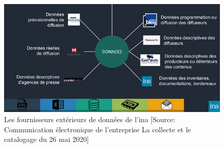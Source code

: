 \begin{figure}[!h]
	\centering
	\includegraphics[width=16cm]{images/enrichissement_dl.jpg}
	\caption[Les fournisseurs extérieurs de données de l'\ac{ina}]{Les fournisseurs extérieurs de données de l'\ac{ina} [Source: Communication électronique  de l'entreprise \og La collecte et le catalogage\fg{} du 26 mai 2020]}
	\label{enrichissement_dl}
\end{figure}

